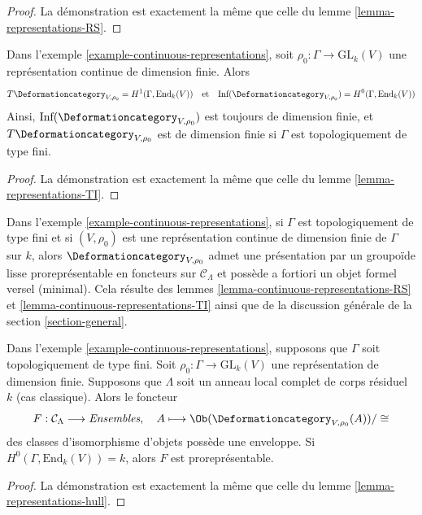 \begin{proof}
La démonstration est exactement la même que celle du
lemme \ref{lemma-representations-RS}.
\end{proof}

\begin{lemma}
\label{lemma-continuous-representations-TI}
Dans l'exemple \ref{example-continuous-representations}, soit
$\rho_0 : \Gamma \to \text{GL}_k(V)$ une représentation continue
de dimension finie. Alors
$$
T\Deformationcategory_{V, \rho_0} = H^1(\Gamma, \text{End}_k(V))
\quad\text{et}\quad
\text{Inf}(\Deformationcategory_{V, \rho_0}) = H^0(\Gamma, \text{End}_k(V))
$$
Ainsi, $\text{Inf}(\Deformationcategory_{V, \rho_0})$
est toujours de dimension finie,
et $T\Deformationcategory_{V, \rho_0}$ est de dimension finie
si $\Gamma$ est topologiquement de type fini.
\end{lemma}

\begin{proof}
La démonstration est exactement la même que celle du
lemme \ref{lemma-representations-TI}.
\end{proof}

\noindent
Dans l'exemple \ref{example-continuous-representations}, si $\Gamma$
est topologiquement de type fini
et si $(V, \rho_0)$ est une représentation continue de dimension finie de $\Gamma$
sur $k$, alors $\Deformationcategory_{V, \rho_0}$
admet une présentation par un groupoïde lisse proreprésentable en foncteurs
sur $\mathcal{C}_\Lambda$
et possède a fortiori un objet formel versel (minimal). Cela résulte
des lemmes \ref{lemma-continuous-representations-RS} et
\ref{lemma-continuous-representations-TI}
ainsi que de la discussion générale de la section \ref{section-general}.

\begin{lemma}
\label{lemma-continuous-representations-hull}
Dans l'exemple \ref{example-continuous-representations}, supposons que $\Gamma$
soit topologiquement de type fini.
Soit $\rho_0 : \Gamma \to \text{GL}_k(V)$ une représentation de dimension finie.
Supposons que $\Lambda$ soit un anneau local complet de corps résiduel $k$
(cas classique). Alors le foncteur
$$
F : \mathcal{C}_\Lambda \longrightarrow \textit{Ensembles},\quad
A \longmapsto \Ob(\Deformationcategory_{V, \rho_0}(A))/\cong
$$
des classes d'isomorphisme d'objets possède une enveloppe. Si
$H^0(\Gamma, \text{End}_k(V)) = k$, alors $F$ est
proreprésentable.
\end{lemma}

\begin{proof}
La démonstration est exactement la même que celle du
lemme \ref{lemma-representations-hull}.
\end{proof}



